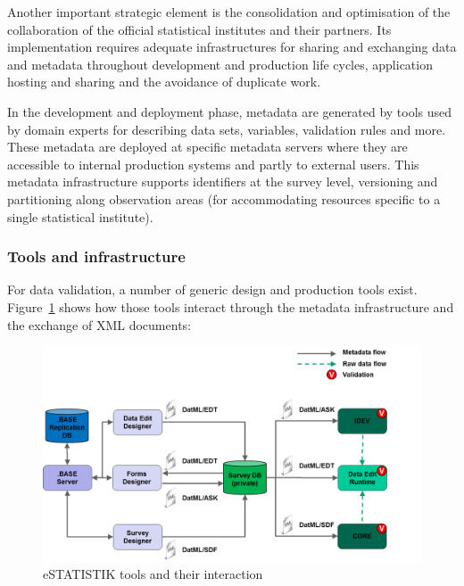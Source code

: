Another important strategic element is the consolidation and optimisation of the collaboration of the official statistical institutes and their partners. Its implementation requires adequate infrastructures for sharing and exchanging data and metadata throughout development and production life cycles, application hosting and sharing and the avoidance of duplicate work.

In the development and deployment phase, metadata are generated by tools used by domain experts for describing data sets, variables, validation rules and more. These metadata are deployed at specific metadata servers where they are accessible to internal production systems and partly to external users. This metadata infrastructure supports identifiers at the survey level, versioning and partitioning along observation areas (for accommodating resources specific to a single statistical institute). 

\subsubsection{Tools and infrastructure}


For data validation, a number of generic design and production tools exist. Figure~\ref{estattools} shows how those tools interact through the metadata infrastructure and the exchange of XML documents:

\begin{figure}[!ht]
\begin{center}
\includegraphics[scale=0.5]{fig/estattools.png} 
\end{center}
\caption{eSTATISTIK tools and their interaction}
\label{estattools}
\end{figure}

